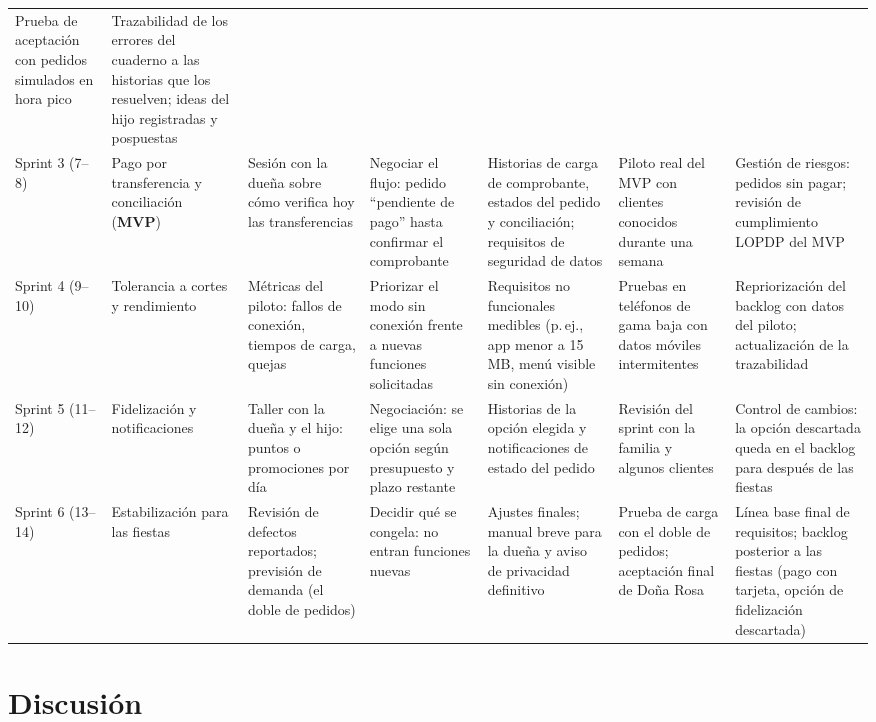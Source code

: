 \documentclass[11pt,a4paper]{article}
\begin{document}
\begin{landscape}
\begin{table}[p]
\begin{tabularx}{\linewidth}{@{}P{1.6cm}P{2.2cm}LLLLL@{}}
Prueba de aceptación con pedidos simulados en hora pico &
Trazabilidad de los errores del cuaderno a las historias que los resuelven; ideas del hijo registradas y pospuestas \\
\addlinespace
Sprint 3 (7--8) & Pago por transferencia y conciliación (\textbf{MVP}) &
Sesión con la dueña sobre cómo verifica hoy las transferencias &
Negociar el flujo: pedido ``pendiente de pago'' hasta confirmar el comprobante &
Historias de carga de comprobante, estados del pedido y conciliación; requisitos de seguridad de datos &
Piloto real del MVP con clientes conocidos durante una semana &
Gestión de riesgos: pedidos sin pagar; revisión de cumplimiento LOPDP del MVP \\
\addlinespace
Sprint 4 (9--10) & Tolerancia a cortes y rendimiento &
Métricas del piloto: fallos de conexión, tiempos de carga, quejas &
Priorizar el modo sin conexión frente a nuevas funciones solicitadas &
Requisitos no funcionales medibles (p.\,ej., app menor a 15\,MB, menú visible sin conexión) &
Pruebas en teléfonos de gama baja con datos móviles intermitentes &
Repriorización del backlog con datos del piloto; actualización de la trazabilidad \\
\addlinespace
Sprint 5 (11--12) & Fidelización y notificaciones &
Taller con la dueña y el hijo: puntos o promociones por día &
Negociación: se elige una sola opción según presupuesto y plazo restante &
Historias de la opción elegida y notificaciones de estado del pedido &
Revisión del sprint con la familia y algunos clientes &
Control de cambios: la opción descartada queda en el backlog para después de las fiestas \\
\addlinespace
Sprint 6 (13--14) & Estabilización para las fiestas &
Revisión de defectos reportados; previsión de demanda (el doble de pedidos) &
Decidir qué se congela: no entran funciones nuevas &
Ajustes finales; manual breve para la dueña y aviso de privacidad definitivo &
Prueba de carga con el doble de pedidos; aceptación final de Doña Rosa &
Línea base final de requisitos; backlog posterior a las fiestas (pago con tarjeta, opción de fidelización descartada) \\
\bottomrule
\end{tabularx}
\end{table}
\end{landscape}

\section{Discusión}
\end{document}
